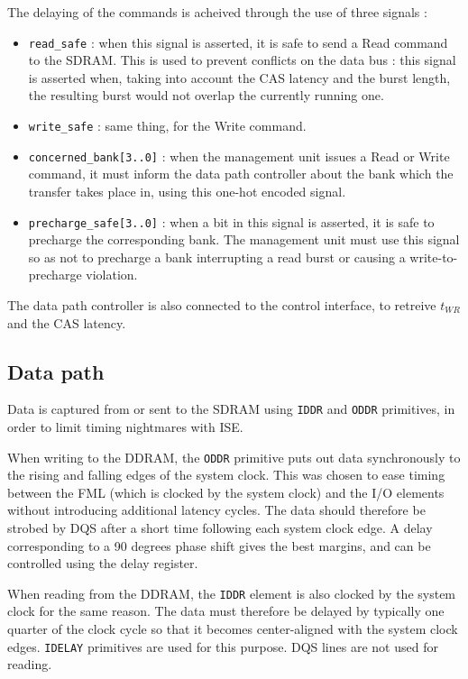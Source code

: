 \documentclass[a4paper,11pt]{article}
\begin{document}
The delaying of the commands is acheived through the use of three signals :
\begin{itemize}
\item \verb!read_safe! : when this signal is asserted, it is safe to send a Read command to the SDRAM. This is used to prevent conflicts on the data bus : this signal is asserted when, taking into account the CAS latency and the burst length, the resulting burst would not overlap the currently running one.
\item \verb!write_safe! : same thing, for the Write command.
\item \verb!concerned_bank[3..0]! : when the management unit issues a Read or Write command, it must inform the data path controller about the bank which the transfer takes place in, using this one-hot encoded signal.
\item \verb!precharge_safe[3..0]! : when a bit in this signal is asserted, it is safe to precharge the corresponding bank. The management unit must use this signal so as not to precharge a bank interrupting a read burst or causing a write-to-precharge violation.
\end{itemize}

The data path controller is also connected to the control interface, to retreive $t_{WR}$ and the CAS latency.

\subsection{Data path}
Data is captured from or sent to the SDRAM using \verb!IDDR! and \verb!ODDR! primitives, in order to limit timing nightmares with ISE.

When writing to the DDRAM, the \verb!ODDR! primitive puts out data synchronously to the rising and falling edges of the system clock. This was chosen to ease timing between the FML (which is clocked by the system clock) and the I/O elements without introducing additional latency cycles. The data should therefore be strobed by DQS after a short time following each system clock edge. A delay corresponding to a 90 degrees phase shift gives the best margins, and can be controlled using the delay register.

When reading from the DDRAM, the \verb!IDDR! element is also clocked by the system clock for the same reason. The data must therefore be delayed by typically one quarter of the clock cycle so that it becomes center-aligned with the system clock edges. \verb!IDELAY! primitives are used for this purpose. DQS lines are not used for reading.
\end{document}
